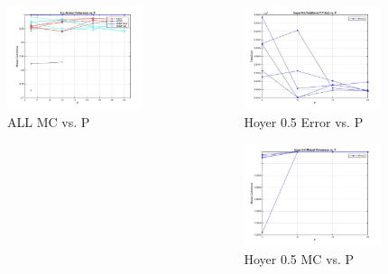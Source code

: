 \documentclass{beamer}
\begin{document}
\begin{frame}
\begin{columns}
\begin{column}{0.33\textwidth}
        \includegraphics[width=4cm,center]{ALL_Mutual_Coherence}
        \\ ALL MC vs. P
        \centering
    \end{column}
    \begin{column}{0.33\textwidth}
        \includegraphics[width=4cm,center]{hoyer-05_TotalError}
        \\ Hoyer 0.5 Error vs. P 
        \centering

        \includegraphics[width=4cm,center]{hoyer-05_Mutual_Coherence}
        \\ Hoyer 0.5 MC  vs. P
        \centering
    \end{column}
\end{columns}
\end{frame}
\end{document}
